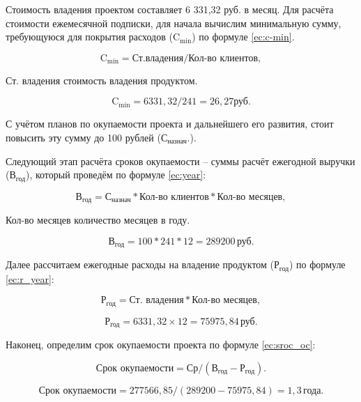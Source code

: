 Стоимость владения проектом составляет 6 331,32 руб. в месяц. Для
расчёта стоимости ежемесячной подписки, для начала вычислим
минимальную сумму, требующуюся для покрытия расходов ($\text{C}_\text{min}$) по
формуле \ref{ec:c-min}.

\begin{equation}
    \label{ec:c-min}
    \text{C}_\text{min} = \text{Ст.владения} / \text{Кол-во клиентов},
\end{equation}

\begin{eqexpl}[13ex]
    \item{Ст. владения} стоимость владения продуктом.
\end{eqexpl}

\begin{equation*}
    \text{C}_\text{min} = 6 331,32 / 241 = 26,27 \text{руб}.
\end{equation*}

С учётом планов по окупаемости проекта и дальнейшего его развития,
стоит повысить эту сумму до 100 рублей ($\text{С}_\text{назнач}.$).

Следующий этап расчёта сроков окупаемости – суммы расчёт
ежегодной выручки ($\text{В}_\text{год}$), который проведём по формуле \ref{ec:year}:

\begin{equation}
    \label{ec:year}
    \text{В}_\text{год} = \text{С}_\text{назнач} * \text{Кол-во клиентов} * \text{Кол-во месяцев},
\end{equation}

\begin{eqexpl}[16ex]
    \item{Кол-во месяцев} количество месяцев в году.
\end{eqexpl}

\begin{equation*}
    \text{В}_\text{год} = 100 * 241 * 12 = 289200 \, \text{руб}.
\end{equation*}

Далее рассчитаем ежегодные расходы на владение продуктом ($\text{Р}_\text{год}$) по
формуле \ref{ec:r_year}:

\begin{equation}
    \label{ec:r_year}
    \text{Р}_\text{год} = \text{Ст. владения} * \text{Кол-во месяцев},
\end{equation}

\begin{equation*}
    \text{Р}_\text{год} =  6 331,32 × 12 = 75 975,84 \, \text{руб}.
\end{equation*}

Наконец, определим срок окупаемости проекта по формуле \ref{ec:sroc_oc}:

\begin{equation}
    \label{ec:sroc_oc}
    \text{Срок окупаемости} = \text{Ср} / (\text{В}_\text{год} - \text{Р}_\text{год}).
\end{equation}

\begin{equation*}
    \text{Срок окупаемости} = 277 566,85 / (289 200 - 75 975,84) = 1,3 \, \text{года}.
\end{equation*}

